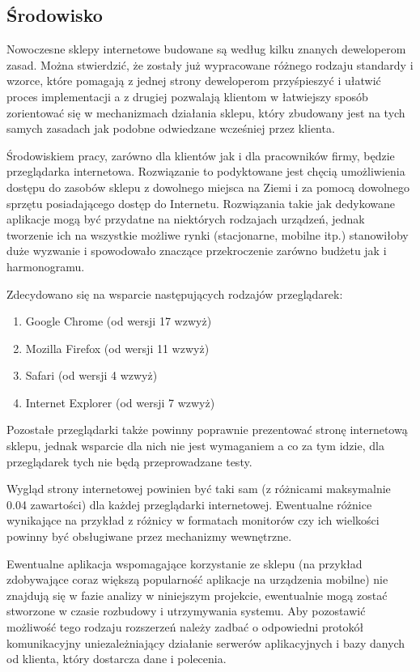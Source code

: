 \subsection{Środowisko}

Nowoczesne sklepy internetowe budowane są według kilku znanych deweloperom
zasad. Można stwierdzić, że zostały już wypracowane różnego rodzaju standardy i
wzorce, które pomagają z jednej strony deweloperom przyśpieszyć i ułatwić proces
implementacji a z drugiej pozwalają klientom w łatwiejszy sposób zorientować się
w mechanizmach działania sklepu, który zbudowany jest na tych samych zasadach
jak podobne odwiedzane wcześniej przez klienta. 

Środowiskiem pracy, zarówno dla klientów jak i dla pracowników firmy, będzie
przeglądarka internetowa. Rozwiązanie to podyktowane jest chęcią umożliwienia
dostępu do zasobów sklepu z dowolnego miejsca na Ziemi i za pomocą dowolnego
sprzętu posiadającego dostęp do Internetu. Rozwiązania takie jak dedykowane
aplikacje mogą być przydatne na niektórych rodzajach urządzeń, jednak tworzenie
ich na wszystkie możliwe rynki (stacjonarne, mobilne itp.) stanowiłoby duże
wyzwanie i spowodowało znaczące przekroczenie zarówno budżetu jak i
harmonogramu. 

Zdecydowano się na wsparcie następujących rodzajów przeglądarek:
\begin{enumerate}
  \item Google Chrome (od wersji 17 wzwyż)
  \item Mozilla Firefox (od wersji 11 wzwyż)
  \item Safari (od wersji 4 wzwyż)
  \item Internet Explorer (od wersji 7 wzwyż)
\end{enumerate}

Pozostałe przeglądarki także powinny poprawnie prezentować stronę internetową
sklepu, jednak wsparcie dla nich nie jest wymaganiem a co za tym idzie, dla
przeglądarek tych nie będą przeprowadzane testy. 

Wygląd strony internetowej powinien być taki sam (z różnicami maksymalnie 0.04%
zawartości) dla każdej przeglądarki internetowej. Ewentualne różnice wynikające
na przykład z różnicy w formatach monitorów czy ich wielkości powinny być
obsługiwane przez mechanizmy wewnętrzne.

Ewentualne aplikacja wspomagające korzystanie ze sklepu (na przykład
zdobywające coraz większą popularność aplikacje na urządzenia mobilne) nie
znajdują się w fazie analizy w niniejszym projekcie, ewentualnie mogą zostać
stworzone w czasie rozbudowy i utrzymywania systemu. Aby pozostawić możliwość
tego rodzaju rozszerzeń należy zadbać o odpowiedni protokół komunikacyjny
uniezależniający działanie serwerów aplikacyjnych i bazy danych od klienta,
który dostarcza dane i polecenia.

